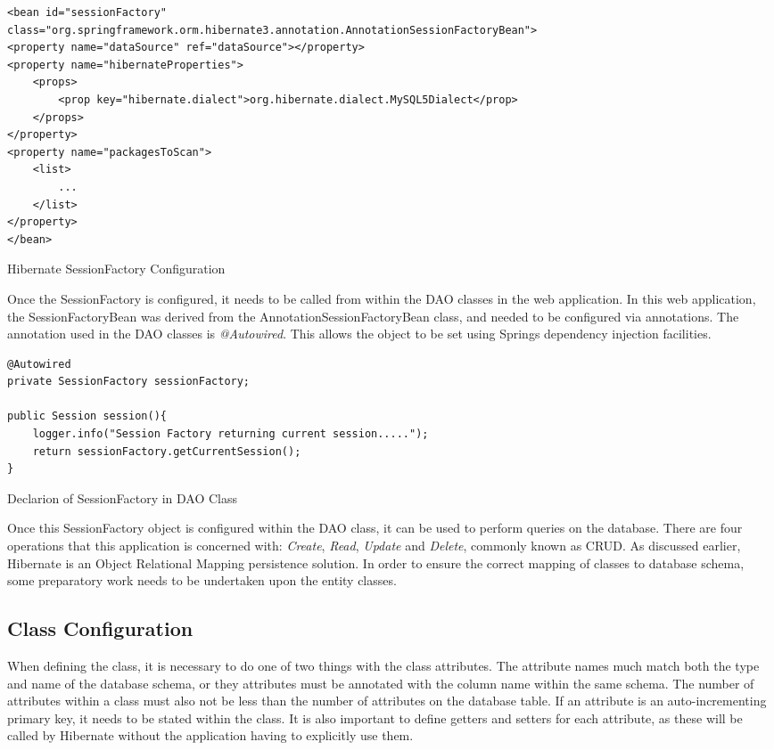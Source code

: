 \begin{table}[H]
\begin{lstlisting}
<bean id="sessionFactory"
class="org.springframework.orm.hibernate3.annotation.AnnotationSessionFactoryBean">
<property name="dataSource" ref="dataSource"></property>
<property name="hibernateProperties">
	<props>
		<prop key="hibernate.dialect">org.hibernate.dialect.MySQL5Dialect</prop>
	</props>
</property>
<property name="packagesToScan">
	<list>
		...
	</list>
</property>
</bean>
\end{lstlisting}
\caption{Hibernate SessionFactory Configuration}
\end{table}

Once the SessionFactory is configured, it needs to be called from within the DAO classes in the web application. In this web application, the SessionFactoryBean was derived from the AnnotationSessionFactoryBean class, and needed to be configured via annotations. The annotation used in the DAO classes is \textit{@Autowired}. This allows the object to be set using Springs dependency injection facilities.

\begin{table}[H]
\begin{lstlisting}
@Autowired
private SessionFactory sessionFactory;

public Session session(){
	logger.info("Session Factory returning current session.....");
	return sessionFactory.getCurrentSession();
}
\end{lstlisting}
\caption{Declarion of SessionFactory in DAO Class}
\end{table}

Once this SessionFactory object is configured within the DAO class, it can be used to perform queries on the database. There are four operations that this application is concerned with: \textit{Create}, \textit{Read}, \textit{Update} and \textit{Delete}, commonly known as CRUD. As discussed earlier, Hibernate is an Object Relational Mapping persistence solution. In order to ensure the correct mapping of classes to database schema, some preparatory work needs to be undertaken upon the entity classes.

\subsection{Class Configuration}

When defining the class, it is necessary to do one of two things with the class attributes. The attribute names much match both the type and name of the database schema, or they attributes must be annotated with the column name within the same schema. The number of attributes within a class must also not be less than the number of attributes on the database table. If an attribute is an auto-incrementing primary key, it needs to be stated within the class. It is also important to define getters and setters for each attribute, as these will be called by Hibernate without the application having to explicitly use them. 

